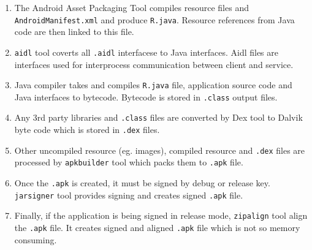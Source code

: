 \begin{enumerate}
\item The Android Asset Packaging Tool compiles resource files and \texttt{AndroidManifest.xml} and produce \texttt{R.java}. Resource references from Java code are then linked to this file.
\item \texttt{aidl} tool coverts all \texttt{.aidl} interfacese to Java interfaces. Aidl files are interfaces used for interprocess communication between client and service.
\item Java compiler takes and compiles \texttt{R.java} file, application source code and Java interfaces to bytecode. Bytecode is stored in \texttt{.class} output files. 
\item Any 3rd party libraries and \texttt{.class} files are converted by Dex tool to Dalvik byte code which is stored in \texttt{.dex} files.
\item Other uncompiled resource (eg. images), compiled resource and \texttt{.dex} files are processed by \texttt{apkbuilder} tool which packs them to \texttt{.apk} file.
\item Once the \texttt{.apk} is created, it must be signed by debug or release key. \texttt{jarsigner} tool provides signing and creates signed \texttt{.apk} file.
\item Finally, if the application is being signed in release mode, \texttt{zipalign} tool align the \texttt{.apk} file. It creates signed and aligned \texttt{.apk} file which is not so memory consuming.
\end{enumerate}

